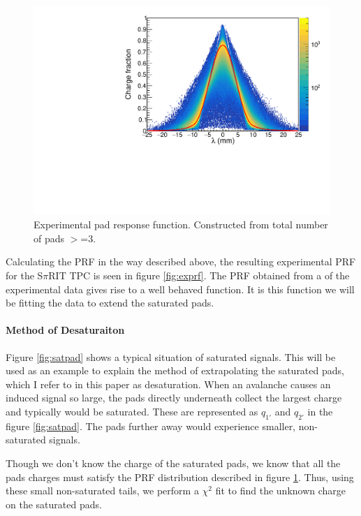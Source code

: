\documentclass[review]{elsarticle}
\begin{document}
\begin{figure}[ht]
\label{fig:expprf}
\includegraphics[width=\linewidth]{expprf}
\caption{Experimental pad response function. Constructed from total number of pads $>$=3. }
\end{figure}

Calculating the PRF in the way described above, the resulting experimental PRF for the S$\pi$RIT TPC is seen in figure \ref{fig:exprf}. The PRF obtained from a of the experimental data gives rise to a well behaved function.  It is this function we will be fitting the data to extend the saturated pads. 

\paragraph{Method of Desaturaiton}

Figure \ref{fig:satpad} shows a typical situation of saturated signals. This will be used as an example to explain the method of extrapolating the saturated pads, which I refer to in this paper as desaturation. When an avalanche causes an induced signal so large, the pads directly underneath collect the largest charge and typically would be saturated. These are represented as $q_{1'}$ and $q_{2'}$ in the figure \ref{fig:satpad}. The pads further away would experience smaller, non-saturated signals. 

Though we don't know the charge of the saturated pads, we know that all the pads charges must satisfy the PRF distribution described in figure \ref{fig:expprf}. Thus, using these small non-saturated tails, we perform a $\chi^2$ fit to find the unknown charge on the saturated pads. 
\end{document}
